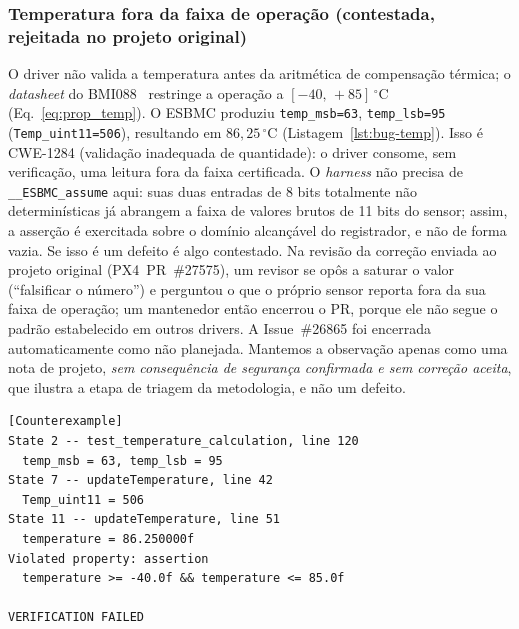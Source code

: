 \documentclass[conference]{IEEEtran}
\begin{document}
\subsubsection{Temperatura fora da faixa de operação (contestada, rejeitada no projeto original)}
O driver não valida a temperatura antes da aritmética de compensação
térmica; o \textit{datasheet} do BMI088~\cite{Bosch2022} restringe a
operação a $[-40,\,+85]\,^\circ$C (Eq.~\eqref{eq:prop_temp}).
O ESBMC produziu \texttt{temp\_msb=63}, \texttt{temp\_lsb=95}
(\texttt{Temp\_uint11=506}), resultando em $86{,}25\,^\circ$C
(Listagem~\ref{lst:bug-temp}).
Isso é CWE-1284 (validação inadequada de quantidade): o driver
consome, sem verificação, uma leitura fora da faixa certificada.
O \textit{harness} não precisa de \texttt{\_\_ESBMC\_assume} aqui:
suas duas entradas de 8 bits totalmente não determinísticas já
abrangem a faixa de valores brutos de 11 bits do sensor; assim, a
asserção é exercitada sobre o domínio alcançável do registrador, e
não de forma vazia.
Se isso é um defeito é algo contestado. Na revisão da correção
enviada ao projeto original (PX4~PR~\#27575), um revisor se opôs a
saturar o valor (``falsificar o número'') e perguntou o que o próprio
sensor reporta fora da sua faixa de operação; um mantenedor então
encerrou o PR, porque ele não segue o padrão estabelecido em outros
drivers. A Issue~\#26865 foi encerrada automaticamente como não
planejada.
Mantemos a observação apenas como uma nota de projeto, \emph{sem
consequência de segurança confirmada e sem correção aceita}, que
ilustra a etapa de triagem da metodologia, e não um defeito.

\begin{lstlisting}[float=t,basicstyle=\ttfamily\scriptsize,
numbers=none,language={},captionpos=b,
caption={Contraexemplo do ESBMC: temperatura do BMI088 de $86{,}25\,^\circ$C
$>$ $85\,^\circ$C. Falta de validação da faixa de entrada (CWE-1284).},
label=lst:bug-temp]
[Counterexample]
State 2 -- test_temperature_calculation, line 120
  temp_msb = 63, temp_lsb = 95
State 7 -- updateTemperature, line 42
  Temp_uint11 = 506
State 11 -- updateTemperature, line 51
  temperature = 86.250000f
Violated property: assertion
  temperature >= -40.0f && temperature <= 85.0f

VERIFICATION FAILED
\end{lstlisting}
\end{document}
